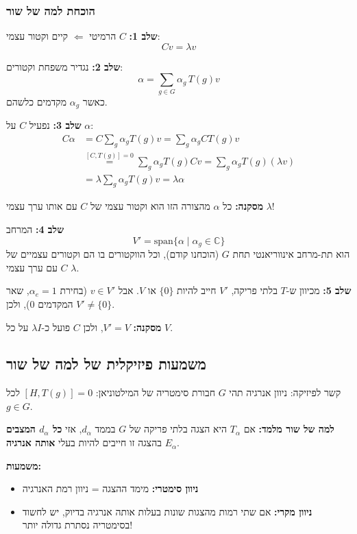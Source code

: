 \subsubsection{הוכחת למה של שור}

\textbf{שלב 1:} $C$ הרמיטי $\Leftarrow$ קיים וקטור עצמי:
\[
C v = \lambda v
\]

\textbf{שלב 2:} נגדיר משפחת וקטורים:
\[
\alpha = \sum_{g \in G} \alpha_g \, T(g) v
\]
כאשר $\alpha_g$ מקדמים כלשהם.

\textbf{שלב 3:} נפעיל $C$ על $\alpha$:
\begin{align*}
C \alpha &= C \sum_g \alpha_g T(g) v = \sum_g \alpha_g C T(g) v \\
&\stackrel{[C,T(g)]=0}{=} \sum_g \alpha_g T(g) C v = \sum_g \alpha_g T(g) (\lambda v) \\
&= \lambda \sum_g \alpha_g T(g) v = \lambda \alpha
\end{align*}

\textbf{מסקנה:} כל $\alpha$ מהצורה הזו הוא וקטור עצמי של $C$ עם אותו ערך עצמי $\lambda$!

\textbf{שלב 4:} המרחב
\[
V' = \text{span}\{\alpha \mid \alpha_g \in \mathbb{C}\}
\]
הוא תת-מרחב אינווריאנטי תחת $G$ (הוכחנו קודם), וכל הווקטורים בו הם וקטורים עצמיים של $C$ עם ערך עצמי $\lambda$.

\textbf{שלב 5:} מכיוון ש-$T$ בלתי פריקה, $V'$ חייב להיות $\{0\}$ או $V$. אבל $v \in V'$ (בחירת $\alpha_e = 1$, שאר המקדמים $0$), ולכן $V' \neq \{0\}$.

\textbf{מסקנה:} $V' = V$, ולכן $C$ פועל כ-$\lambda I$ על כל $V$. 

\subsection{משמעות פיזיקלית של למה של שור}

\begin{importantbox}[label=box:schur_physics]{קשר לפיזיקה: ניוון אנרגיה}
תהי $G$ חבורת סימטריה של המילטוניאן: $[H, T(g)] = 0$ לכל $g \in G$.

\textbf{למה של שור מלמד:} אם $T_\alpha$ היא הצגה בלתי פריקה של $G$ בממד $d_\alpha$, אזי \textbf{כל $d_\alpha$ המצבים} בהצגה זו חייבים להיות בעלי \textbf{אותה אנרגיה} $E_\alpha$.

\textbf{משמעות:}
\begin{itemize}
    \item \textbf{ניוון סימטרי:} מימד ההצגה = ניוון רמת האנרגיה
    \item \textbf{ניוון מקרי:} אם שתי רמות מהצגות שונות בעלות אותה אנרגיה בדיוק, יש לחשוד בסימטריה נסתרת גדולה יותר!
\end{itemize}
\end{importantbox}

